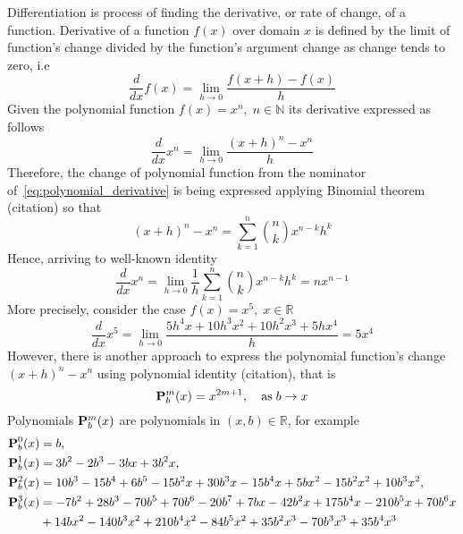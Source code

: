 Differentiation is process of finding the derivative, or rate of change, of a function.
Derivative of a function $f(x)$ over domain $x$ is defined by the limit of function's change divided
by the function's argument change as change tends to zero, i.e
\begin{equation*}
    \frac{d}{dx} f(x) = \lim_{h \to 0} \frac{f(x+h) - f(x)}{h}
\end{equation*}
Given the polynomial function $f(x)=x^n, \; n \in \mathbb{N}$ its derivative expressed as follows
\begin{equation}
    \frac{d}{dx} x^n = \lim_{h \to 0} \frac{(x+h)^n - x^n}{h} \label{eq:polynomial_derivative}
\end{equation}
Therefore, the change of polynomial function from the nominator of~\eqref{eq:polynomial_derivative}
is being expressed applying Binomial theorem (citation) so that
\begin{equation*}
(x+h)
    ^n - x^n = \sum_{k=1}^{n} \binom{n}{k} x^{n-k} h^k
\end{equation*}
Hence, arriving to well-known identity
\begin{equation*}
    \frac{d}{dx} x^n = \lim_{h \to 0} \frac{1}{h} \sum_{k=1}^{n} \binom{n}{k} x^{n-k} h^k = n x^{n-1}
\end{equation*}
More precisely, consider the case $f(x) = x^5, \; x\in\mathbb{R}$
\begin{equation*}
    \frac{d}{dx} x^5 = \lim_{h \to 0} \frac{5 h^4 x + 10 h^3 x^2 + 10 h^2 x^3 + 5 h x^4}{h} = 5x^4
\end{equation*}
However, there is another approach to express the polynomial function's change $(x+h)^n - x^n$ using polynomial identity
(citation), that is
\begin{equation*}
    {\mathbf{P}}\sp{m} \sb{b}(x) = x^{2m+1}, \quad \mathrm{as} \; b \to x
\end{equation*}
Polynomials ${\mathbf{P}}\sp{m} \sb{b}(x)$ are polynomials in $(x,b) \in \mathbb{R}$, for example
\begin{equation*}
    \begin{split}
        {\mathbf{P}}\sp{0} \sb{b}(x)
        &=b, \\
        {\mathbf{P}}\sp{1} \sb{b}(x)
        &=3 b^2 - 2 b^3 - 3 b x + 3 b^2 x, \\
        {\mathbf{P}}\sp{2} \sb{b}(x)
        &=10 b^3 - 15 b^4 + 6 b^5 - 15 b^2 x + 30 b^3 x - 15 b^4 x + 5 b x^2 - 15 b^2 x^2 + 10 b^3 x^2, \\
        {\mathbf{P}}\sp{3} \sb{b}(x)
        &=-7 b^2 + 28 b^3 - 70 b^5 + 70 b^6 - 20 b^7 + 7 b x - 42 b^2 x + 175 b^4 x - 210 b^5 x + 70 b^6 x \\
        &+ 14 b x^2 - 140 b^3 x^2 + 210 b^4 x^2 - 84 b^5 x^2 + 35 b^2 x^3 - 70 b^3 x^3 + 35 b^4 x^3
    \end{split}
\end{equation*}
